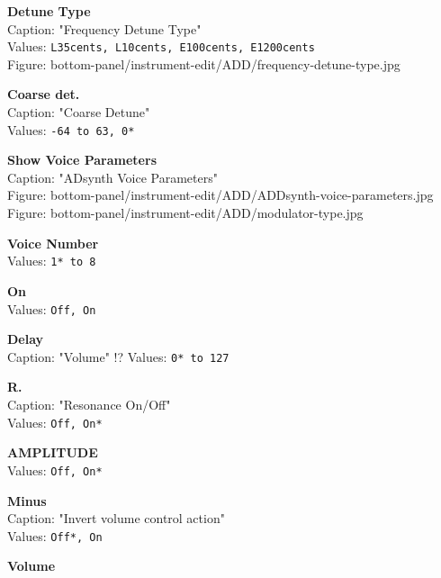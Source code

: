 \documentclass[
 11pt,
 twoside,
 a4paper,
 headinclude,
 footinclude,
 final                                 %
]{article}
\begin{document}
\begin{enumber}
\begin{enumber}
\begin{enumber}
\begin{enumber}
            \item \textbf{Detune Type} \\
               Caption: "Frequency Detune Type" \\
               Values: \texttt{L35cents, L10cents, E100cents, E1200cents} \\
               Figure: bottom-panel/instrument-edit/ADD/frequency-detune-type.jpg
            \item \textbf{Coarse det.} \\
               Caption: "Coarse Detune" \\
               Values: \texttt{-64 to 63, 0*}
         \end{enumber}

         \item \textbf{Show Voice Parameters} \\
            Caption: "ADsynth Voice Parameters" \\
            Figure: bottom-panel/instrument-edit/ADD/ADDsynth-voice-parameters.jpg \\
            Figure: bottom-panel/instrument-edit/ADD/modulator-type.jpg
            \begin{enumber}
               \item \textbf{Voice Number} \\
                  Values: \texttt{1* to 8}
               \item \textbf{On} \\
                  Values: \texttt{Off, On}
               \item \textbf{Delay} \\
                  Caption: "Volume" !?
                  Values: \texttt{0* to 127}
               \item \textbf{R.} \\
                  Caption: "Resonance On/Off" \\
                  Values: \texttt{Off, On*}
               \item \textbf{AMPLITUDE} \\
                  Values: \texttt{Off, On*}
               \begin{enumber}
                  \item \textbf{Minus} \\
                     Caption: "Invert volume control action" \\
                     Values: \texttt{Off*, On}
                  \item \textbf{Volume} \\

\end{enumber}
\end{enumber}
\end{enumber}
\end{enumber}
\end{enumber}
\end{document}
